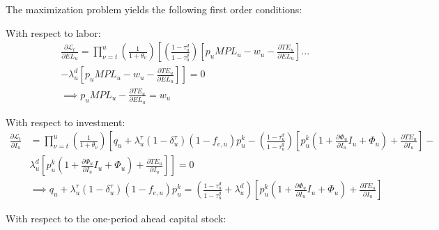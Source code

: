 The maximization problem yields the following first order conditions:

With respect to labor:
\begin{equation}
\label{eqn:foc_l}
\begin{split}
&\frac{\partial \mathcal{L}_{t}}{\partial EL_{u}} = \prod_{\nu=t}^{u}\left(\frac{1}{1+\theta_{\nu}}\right)\left[ \left(\frac{1-\tau^{d}_{u}}{1-\tau^{g}_{u}}\right)\left[p_{u}MPL_{u} - w_{u} - \frac{\partial TE_{u}}{\partial EL_{u}}\right] ... \right. \\
& \left. - \lambda^{d}_{u}\left[p_{u}MPL_{u} - w_{u} - \frac{\partial TE_{u}}{\partial EL_{u}}\right] \right] = 0  \\
& \implies  p_{u}MPL_{u}- \frac{\partial TE_{u}}{\partial EL_{u}} = w_{u}
\end{split}
\end{equation}


With respect to investment:
 \begin{equation}
\label{eqn:foc_i}
\begin{split}
\frac{\partial \mathcal{L}_{t}}{\partial I_{u}} & =  \prod_{\nu=t}^{u}\left(\frac{1}{1+\theta_{\nu}}\right) \left[ q_{u} + \lambda^{\tau}_{u}(1-\delta^{\tau}_{u})(1-f_{e,u})p^{k}_{u} -  \left(\frac{1-\tau^{d}_{u}}{1-\tau^{g}_{u}}\right) \left[p^{k}_{u}(1+ \frac{\partial \Phi_{u}}{\partial I_{u}}I_{u} + \Phi_{u}) + \frac{\partial TE_{u}}{\partial I_{u}} \right] - \right. \\
& \left. \lambda^{d}_{u}\left[p^{k}_{u}(1+ \frac{\partial \Phi_{u}}{\partial I_{u}}I_{u} + \Phi_{u}) + \frac{\partial TE_{u}}{\partial I_{u}} \right]\right]= 0 \\
& \implies q_{u} + \lambda^{\tau}_{u}(1-\delta^{\tau}_{u})(1-f_{e,u})p^{k}_{u} =  \left(\frac{1-\tau^{d}_{u}}{1-\tau^{g}_{u}} + \lambda^{d}_{u}\right)\left[p^{k}_{u}(1+ \frac{\partial \Phi_{u}}{\partial I_{u}}I_{u} + \Phi_{u}) + \frac{\partial TE_{u}}{\partial I_{u}}\right]
\end{split}
\end{equation}

With respect to the one-period ahead capital stock:


